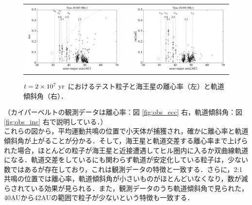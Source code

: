 \documentclass[11pt,a4paper,oneside,onecolumn]{jreport}
\begin{document}
\begin{figure}[H]
\begin{tabular}{ccc}
\begin{minipage}[t]{0.45\hsize}
\centering
\includegraphics[width=8cm]{./image/kuiper_ecc_20Myr.pdf}
\end{minipage} &
\begin{minipage}[t]{0.1\hsize}
\end{minipage} &
\begin{minipage}[t]{0.45\hsize}
\centering
\includegraphics[width=8cm]{./image/kuiper_inc_20Myr.pdf}
\end{minipage}\\
%
\end{tabular}
\caption{$t = 2 \times 10^7\ {\rm yr}$ におけるテスト粒子と海王星の離心率（左）と軌道傾斜角（右）．\label{fig:kuiper_ecc_inc_20Myr}}
\end{figure}

（カイパーベルトの観測データは離心率：図 \ref{fig:obs_ecc} 右，軌道傾斜角：図 \ref{fig:obs_inc} 右で説明している．）
\\

これらの図から，平均運動共鳴の位置で小天体が捕獲され，確かに離心率と軌道傾斜角が上がることが分かる．そして，海王星と軌道交差する離心率まで上げられた場合，ほとんどの粒子が海王星と近接遭遇してヒル圏内に入るか双曲線軌道になる．軌道交差をしているにも関わらず軌道が安定化している粒子は，少ない数ではあるが存在しており，これは観測データの特徴と一致する．さらに，2:1共鳴の位置では離心率，軌道傾斜角が小さいものがほとんどいなくなり，数が減らされている効果が見られる．また，観測データのうち軌道傾斜角で見られた，40AUから42AUの範囲で粒子が少ないという特徴も一致する．
\end{document}
